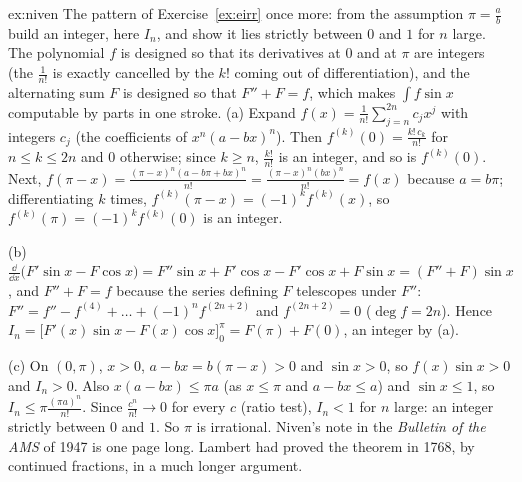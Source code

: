 \begin{solution}{ex:niven}
\idea The pattern of Exercise~\ref{ex:eirr} once more: from the assumption $\pi=\frac ab$ build an integer, here $I_n$, and show it lies strictly between $0$ and $1$ for $n$ large. The polynomial $f$ is designed so that its derivatives at $0$ and at $\pi$ are integers (the $\frac1{n!}$ is exactly cancelled by the $k!$ coming out of differentiation), and the alternating sum $F$ is designed so that $F''+F=f$, which makes $\int f\sin x$ computable by parts in one stroke.
\writeup (a) Expand $f(x)=\frac1{n!}\sum_{j=n}^{2n}c_jx^j$ with integers $c_j$ (the coefficients of $x^n(a-bx)^n$). Then $f^{(k)}(0)=\frac{k!\,c_k}{n!}$ for $n\le k\le2n$ and $0$ otherwise; since $k\ge n$, $\frac{k!}{n!}$ is an integer, and so is $f^{(k)}(0)$. Next, $f(\pi-x)=\frac{(\pi-x)^n(a-b\pi+bx)^n}{n!}=\frac{(\pi-x)^n(bx)^n}{n!}=f(x)$ because $a=b\pi$; differentiating $k$ times, $f^{(k)}(\pi-x)=(-1)^kf^{(k)}(x)$, so $f^{(k)}(\pi)=(-1)^kf^{(k)}(0)$ is an integer.

(b) $\frac{\dd}{\dd x}\bigl(F'\sin x-F\cos x\bigr)=F''\sin x+F'\cos x-F'\cos x+F\sin x=(F''+F)\sin x$, and $F''+F=f$ because the series defining $F$ telescopes under $F''$: $F''=f''-f^{(4)}+\dots+(-1)^nf^{(2n+2)}$ and $f^{(2n+2)}=0$ ($\deg f=2n$). Hence
$I_n=\bigl[F'(x)\sin x-F(x)\cos x\bigr]_0^\pi=F(\pi)+F(0)$, an integer by (a).

(c) On $(0,\pi)$, $x>0$, $a-bx=b(\pi-x)>0$ and $\sin x>0$, so $f(x)\sin x>0$ and $I_n>0$. Also $x(a-bx)\le\pi a$ (as $x\le\pi$ and $a-bx\le a$) and $\sin x\le1$, so $I_n\le\pi\frac{(\pi a)^n}{n!}$. Since $\frac{c^n}{n!}\to0$ for every $c$ (ratio test), $I_n<1$ for $n$ large: an integer strictly between $0$ and $1$. So $\pi$ is irrational.
Niven's note in the \emph{Bulletin of the AMS} of 1947 is one page long. Lambert had proved the theorem in 1768, by continued fractions, in a much longer argument.
\end{solution}

